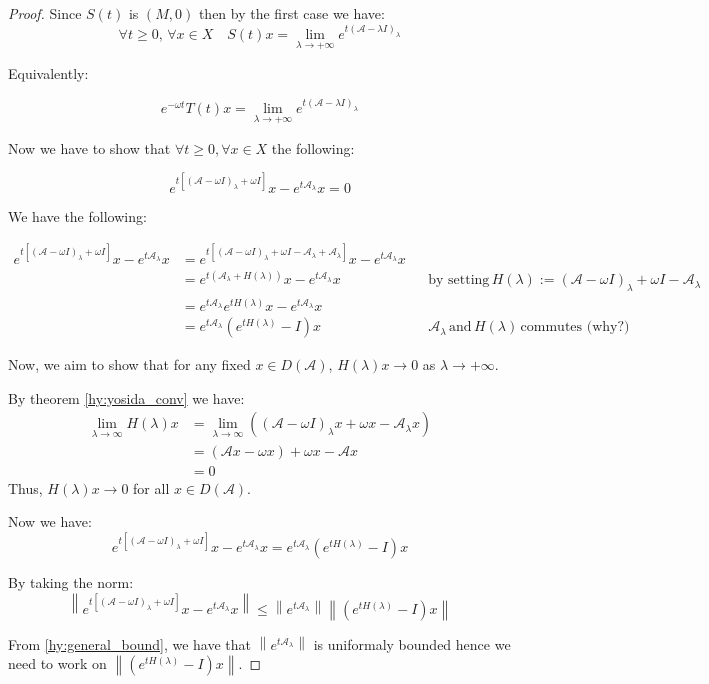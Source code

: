 \documentclass[12pt, oneside]{book}
\newcommand{\norm}[1]{\left\lVert#1\right\rVert}
\newcommand{\A}{\mathscr{A}}
\begin{document}
\begin{proof}
Since $S(t)$ is $(M, 0)$ then by the first case we have:
$$
\forall{t} \ge 0, \, \forall{x} \in X \quad S(t)x = \lim_{\lambda \to +\infty}{e^{t(\A - \lambda I)_{\lambda}}}
$$

Equivalently:

$$
e^{- \omega t} T(t)x = \lim_{\lambda \to +\infty}{e^{t(\A - \lambda I)_{\lambda}}}
$$

Now we have to show that $\forall t \ge 0, \forall x \in X$ the following:

$$
e^{t[(\A - \omega I)_{\lambda} + \omega I]}x - e^{t \A_{\lambda}}x = 0
$$

We have the following:

\begin{align*}
	e^{t[(\A - \omega I)_{\lambda} + \omega I]}x - e^{t \A_{\lambda}}x
	&= e^{t[(\A - \omega I)_{\lambda} + \omega I - \A_{\lambda} + \A_{\lambda}]}x - e^{t \A_{\lambda}}x \\
	&= e^{t (\A_\lambda + H(\lambda))} x - e^{t \A_\lambda} x && \text{by setting} \, H(\lambda) := (\A - \omega I)_{\lambda} + \omega I - \A_{\lambda} \\
	&= e^{t \A_\lambda} e^{t H(\lambda)} x - e^{t \A_\lambda} x \\
	&= e^{t \A_\lambda} \left( e^{t H(\lambda)} - I \right) x  && \A_{\lambda} \, \text{and} \, H(\lambda) \, \text{commutes (why?)}
\end{align*}

\noindent Now, we aim to show that for any fixed $x \in D(\A)$, $H(\lambda)x \to 0$ as $\lambda \to +\infty$.

By theorem \ref{hy:yosida_conv} we have:
\begin{align*}
    \lim_{\lambda \to \infty} H(\lambda)x &= \lim_{\lambda \to \infty} \left( (\A - \omega I)_\lambda x + \omega x - \A_\lambda x \right) \\
    &= (\A x - \omega x) + \omega x - \A x \\
    &= 0
\end{align*}
Thus, $H(\lambda)x \to 0$ for all $x \in D(\A)$.

Now we have:
$$
e^{t[(\A - \omega I)_{\lambda} + \omega I]}x - e^{t \A_{\lambda}}x = e^{t \A_\lambda} \left( e^{t H(\lambda)} - I \right) x
$$

By taking the norm:
$$
\norm{e^{t[(\A - \omega I)_{\lambda} + \omega I]}x - e^{t \A_{\lambda}}x} \le \norm{e^{t \A_\lambda}} \norm{\left( e^{t H(\lambda)} - I \right) x}
$$

From \eqref{hy:general_bound}, we have that $\norm{e^{t \A_\lambda}}$ is uniformaly bounded hence we need to work on $\norm{\left( e^{t H(\lambda)} - I \right) x}$.


\end{proof}
\end{document}
